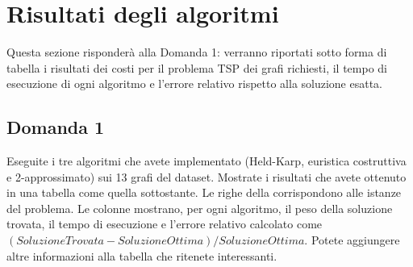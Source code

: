 \section{Risultati degli algoritmi}
Questa sezione risponderà alla Domanda 1: verranno riportati sotto forma di tabella i risultati dei costi per il problema TSP dei grafi richiesti, il tempo di esecuzione di ogni algoritmo e l'errore relativo rispetto alla soluzione esatta.

\subsection{Domanda 1}
Eseguite i tre algoritmi che avete implementato (Held-Karp, euristica costruttiva e 2-approssimato) sui 13 grafi del dataset. Mostrate i risultati che avete ottenuto in una tabella come quella sottostante. Le righe della corrispondono alle istanze del problema. Le colonne mostrano, per ogni algoritmo, il peso della soluzione trovata, il tempo di esecuzione e l'errore relativo calcolato come $(SoluzioneTrovata - SoluzioneOttima)/SoluzioneOttima$. Potete aggiungere altre informazioni alla tabella che ritenete interessanti. 
